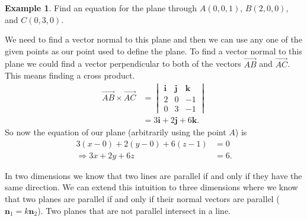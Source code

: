 \documentclass[12pt, letter]{article}
\theoremstyle{plain}
\numberwithin{theorem}{section}
\theoremstyle{definition}
\newtheorem{example}[theorem]{Example}
\begin{document}
\begin{example}
Find an equation for the plane through $A(0,0,1)$, $B(2,0,0)$, and $C(0,3,0)$.

\smallskip

We need to find a vector normal to this plane and then we can use any one of the given points as our point used to define the plane. To find a vector normal to this plane we could find a vector perpendicular to both of the vectors $\vec{AB}$ and $\vec{AC}$. This means finding a cross product.
\begin{align*}
\vec{AB} \times \vec{AC} &= \begin{vmatrix} \bm{i} & \bm{j} & \bm{k} \\ 2 & 0 & -1 \\ 0 & 3 & -1 \end{vmatrix}\\
&= 3 \bm{i} + 2\bm{j} + 6\bm{k}.
\end{align*}
So now the equation of our plane (arbitrarily using the point $A$) is
\begin{align*}
3(x-0)+2(y-0)+6(z-1) &= 0\\
\Rightarrow 3x+2y+6z &=6.
\end{align*}
\end{example}

\bigskip

\hrulefill

\bigskip

In two dimensions we know that two lines are parallel if and only if they have the same direction. We can extend this intuition to three dimensions where we know that two planes are parallel if and only if their normal vectors are parallel ($\bm{n}_1=k \bm{n}_2$). Two planes that are not parallel intersect in a line.

\bigskip

\hrulefill

\bigskip
\end{document}
